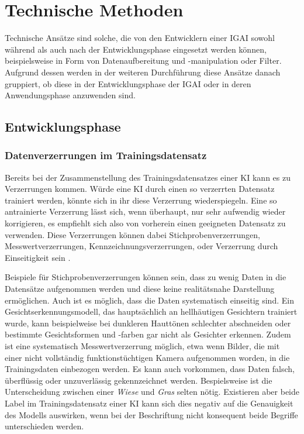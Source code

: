 \documentclass[12pt]{article}
\begin{document}
\section{Technische Methoden}

Technische Ansätze sind solche, die von den Entwicklern einer IGAI sowohl während als auch nach der Entwicklungsphase eingesetzt werden können, beispielsweise in Form von Datenaufbereitung und -manipulation oder Filter. 
Aufgrund dessen werden in der weiteren Durchführung diese Ansätze danach gruppiert, ob diese in der Entwicklungsphase der IGAI oder in deren Anwendungsphase anzuwenden sind.

\subsection{Entwicklungsphase}
\subsubsection{Datenverzerrungen im Trainingsdatensatz}
Bereits bei der Zusammenstellung des Trainingsdatensatzes einer KI kann es zu Verzerrungen kommen. Würde eine KI durch einen so verzerrten Datensatz trainiert werden, könnte sich in ihr diese Verzerrung wiederspiegeln. Eine so antrainierte Verzerrung lässt sich, wenn überhaupt, nur sehr aufwendig wieder korrigieren, es empfiehlt sich also von vorherein einen geeigneten Datensatz zu verwenden.
Diese Verzerrungen können dabei Stichprobenverzerrungen, Messwertverzerrungen, Kennzeichnungsverzerrungen, oder Verzerrung durch Einseitigkeit sein \cite[S. 48ff.]{Srinivasan}.

Beispiele für Stichprobenverzerrungen können sein, dass zu wenig Daten in die Datensätze aufgenommen werden und diese keine realitätsnahe Darstellung ermöglichen.
Auch ist es möglich, dass die Daten systematisch einseitig sind. Ein Gesichtserkennungsmodell, das hauptsächlich an hellhäutigen Gesichtern trainiert wurde, kann beispielweise bei dunkleren Hauttönen schlechter abschneiden oder bestimmte Gesichtsformen und -farben gar nicht als Gesichter erkennen.
Zudem ist eine systematisch Messwertverzerrung möglich, etwa wenn Bilder, die mit einer nicht vollständig funktionstüchtigen Kamera aufgenommen worden, in die Trainingsdaten einbezogen werden.
Es kann auch vorkommen, dass Daten falsch, überflüssig oder unzuverlässig gekennzeichnet werden. Bespielsweise ist die Unterscheidung zwischen einer \textit{Wiese} und \textit{Gras} selten nötig. Existieren aber beide Label im Trainingsdatensatz einer KI kann sich dies negativ auf die Genauigkeit des Modells auswirken, wenn bei der Beschriftung nicht konsequent beide Begriffe unterschieden werden\cite[S. 48ff.]{Srinivasan}. 
\end{document}
